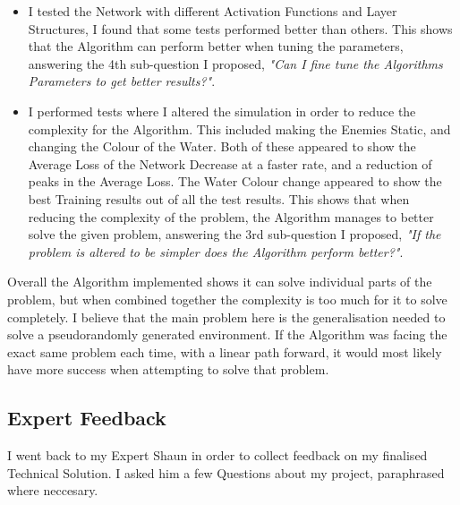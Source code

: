 \begin{flushleft}
\begin{itemize}
            \item I tested the Network with different Activation Functions and Layer Structures, I found that some tests performed better than others.
            This shows that the Algorithm can perform better when tuning the parameters, answering the 4th sub-question I proposed, 
            \textit{"Can I fine tune the Algorithms Parameters to get better results?"}. \\
            \vspace{0.2cm}

            \item I performed tests where I altered the simulation in order to reduce the complexity for the Algorithm. This included making the 
            Enemies Static, and changing the Colour of the Water. Both of these appeared to show the Average Loss of the Network Decrease at
            a faster rate, and a reduction of peaks in the Average Loss. The Water Colour change appeared to show the best Training results out of all
            the test results. This shows that when reducing the complexity of the problem, the Algorithm manages to better solve the given problem,
            answering the 3rd sub-question I proposed, \textit{"If the problem is altered to be simpler does the Algorithm perform better?"}.\\
            \vspace{0.2cm}
        \end{itemize}

        Overall the Algorithm implemented shows it can solve individual parts of the problem, but when combined together the complexity
        is too much for it to solve completely. I believe that the main problem here is the generalisation needed to solve a pseudorandomly
        generated environment. If the Algorithm was facing the exact same problem each time, with a linear path forward, it would most likely
        have more success when attempting to solve that problem.
    \subsection{Expert Feedback}
        \vspace{0.2cm}
        I went back to my Expert Shaun in order to collect feedback on my finalised Technical Solution. I asked him a few Questions about my
        project, paraphrased where neccesary. \\
        \vspace{0.5cm}


\end{flushleft}
